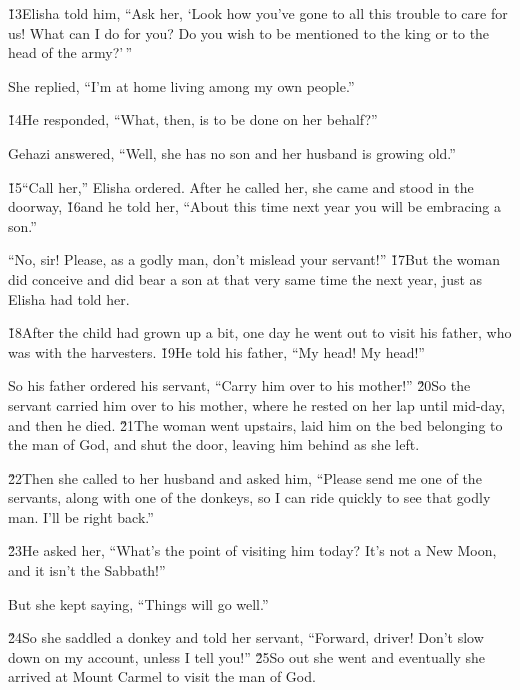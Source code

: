 \v{13}Elisha told him, ``Ask her, `Look how you've gone to all this trouble to care for us! What can I do for you? Do you wish to be mentioned to the king or to the head of the army?'\,''

She replied, ``I'm at home living among my own people.''

\v{14}He responded, ``What, then, is to be done on her behalf?''

Gehazi answered, ``Well, she has no son and her husband is growing old.''

\v{15}``Call her,'' Elisha ordered. After he called her, she came and stood in the doorway, \v{16}and he told her, ``About this time next year you will be embracing a son.''

``No, sir! Please, as a godly man, don't mislead your servant!'' \v{17}But the woman did conceive and did bear a son at that very same time the next year, just as Elisha had told her.

\v{18}After the child had grown up a bit, one day he went out to visit his father, who was with the harvesters. \v{19}He told his father, ``My head! My head!''

So his father ordered his servant, ``Carry him over to his mother!'' \v{20}So the servant carried him over to his mother, where he rested on her lap until mid-day, and then he died. \v{21}The woman went upstairs, laid him on the bed belonging to the man of God, and shut the door, leaving him behind as she left.

\v{22}Then she called to her husband and asked him, ``Please send me one of the servants, along with one of the donkeys, so I can ride quickly to see that godly man. I'll be right back.''

\v{23}He asked her, ``What's the point of visiting him today? It's not a New Moon, and it isn't the Sabbath!''

But she kept saying, ``Things will go well.''

\v{24}So she saddled a donkey and told her servant, ``Forward, driver! Don't slow down on my account, unless I tell you!'' \v{25}So out she went and eventually she arrived at Mount Carmel to visit the man of God.


